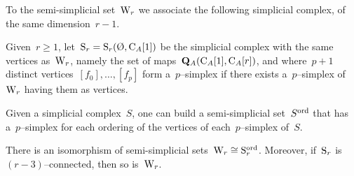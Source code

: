 
To the semi-simplicial set~$\mathrm{W}_r$ we associate the following simplicial complex, of the same dimension~\hbox{$r-1$}. 

\begin{definition} 
Given~$r\geqslant1$, let~$\rmS_r=\rmS_r(\emptyset,\rmC_A[1])$ be the simplicial complex with the same vertices as~$\mathrm{W}_r$, namely the set of maps~$\mathbf{Q}_A(\mathrm{C}_A[1],\mathrm{C}_A[r])$, and where~$p+1$ distinct vertices~$[f_0],\dots,[f_p]$ form a~$p$--simplex if there exists a~$p$--simplex of~$\mathrm{W}_r$ having them as vertices.
\end{definition}

Given a simplicial complex~$S$, one can build a semi-simplicial set~$S^{\operatorname{ord}}$ that has a~$p$--simplex for each ordering of the vertices of each~$p$--simplex of~$S$.  

\begin{proposition}\label{prop:S=>W}
 There is an isomorphism of  semi-simplicial sets~$\mathrm{W}_r\cong\mathrm{S}_r^{\operatorname{ord}}$. Moreover, if~$\mathrm{S}_r$ is~$(r-3)$--connected, then so is~$\mathrm{W}_r$.  
\end{proposition}

